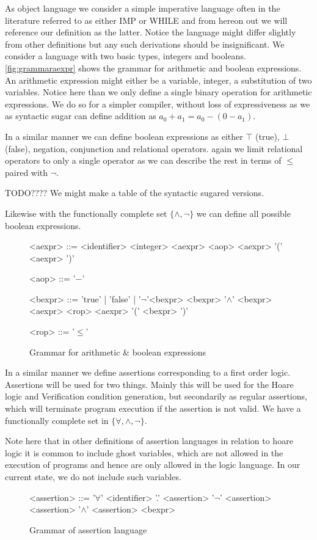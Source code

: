 As object language we consider a simple imperative language often in the literature referred to as either
IMP or WHILE and from hereon out we will reference our definition as the latter. Notice the language might differ slightly from other definitions but any such derivations should be insignificant.
We consider a language with two basic types, integers and booleans.
\autoref{fig:grammaraexpr} shows the grammar for arithmetic and boolean expressions.
An arithmetic expression might either be a variable, integer, a substitution of two variables.
Notice here than we only define a single binary operation for arithmetic expressions.
We do so for a simpler compiler, without loss of expressiveness as we as syntactic sugar can define addition as
$a_{0} + a_{1} = a_{0} - (0 - a_{1})$.

In a similar manner we can define boolean expressions as either $\top$ (true), $\bot$ (false), negation, conjunction
and relational operators. again we limit relational operators to only a single operator as we can describe the rest in terms of $\leq$ paired with $\neg$.

\colorbox{BurntOrange}{TODO???? We might make a table of the syntactic sugared versions.}

Likewise with the functionally complete set $\{\wedge, \neg\}$ we can define all possible boolean expressions.

\begin{figure}[h!]
\centering
\begin{grammar}
<aexpr> ::= <identifier>
\alt <integer>
\alt <aexpr> <aop> <aexpr>
\alt '(' <aexpr> ')'

<aop> ::= '$-$'

<bexpr> ::= 'true' | 'false' | \alt '$\neg$'<bexpr>
\alt <bexpr> '$\wedge$' <bexpr>
\alt <aexpr> <rop> <aexpr>
\alt '(' <bexpr> ')'

<rop> ::= '$\le$'
\end{grammar}
\label{fig:grammaraexpr}
\caption{Grammar for arithmetic \& boolean expressions}
\end{figure}

In a similar manner we define assertions corresponding to a first order logic. Assertions
will be used for two things. Mainly this will be used for the Hoare logic and Verification condition generation,
but secondarily as regular assertions, which will terminate program execution if the assertion is not valid.
We have a functionally complete set in $\{\forall, \wedge, \neg\}$.

Note here that in other definitions of assertion languages in relation to hoare logic it is common to include ghost variables, which are not allowed in the execution of programs and hence are only allowed in the logic language. In our current state, we do not include such variables.
\begin{figure}[h!]
\centering
\begin{grammar}
<assertion> ::= '$\forall$' <identifier> '.' <assertion>
\alt '$\neg$' <assertion>
\alt <assertion> '$\wedge$' <assertion>
\alt <bexpr>
\end{grammar}
\label{fig:grammaraexpr}
\caption{Grammar of assertion language}
\end{figure}

